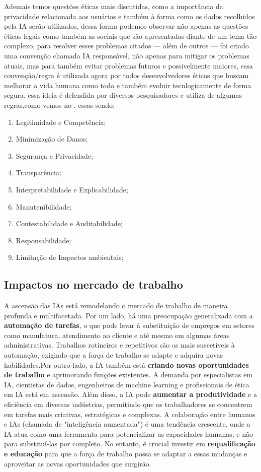 \documentclass[12pt,a4paper]{article}
\begin{document}
      Ademais temos questões éticas mais discutidas, como a importância da privacidade relacionada aos usuários e também à forma como os dados recolhidos
    pela IA serão utilizados, dessa forma podemos observar não apenas as questões éticas legais como também as sociais que são apresentadas diante de um tema tão complexo,
    para resolver esses problemas citados — além de outros — foi criado uma convenção chamada IA responsável, não apenas para mitigar os problemas atuais, 
    mas para também evitar problemas futuros e possivelmente maiores, essa convenção/regra é utilizada agora por todos desenvolvedores éticos que buscam melhorar
    a vida humana como todo e também evoluir tecnlogicamente de forma segura, essa ideia é defendida por diversos pesquisadores e utiliza de algumas regras,como vemos no \cite{Almeida_Nas_2024}. essas sendo:
    \begin{enumerate} [label=\Roman*]
      \item Legitimidade e Competência;
      \item Minimização de Danos;
      \item Segurança e Privacidade;
      \item Transparência;
      \item Interpretabilidade e Explicabilidade;
      \item Manutenibilidade;
      \item Contestabilidade e Auditabilidade;
      \item Responsabilidade;
      \item Limitação de Impactos ambientais;
    \end{enumerate}

    \subsection{Impactos no mercado de trabalho}

      A ascensão das IAs está remodelando o mercado de trabalho de maneira profunda e multifacetada. Por um lado, há uma preocupação generalizada com a 
    \textbf{automação de tarefas}, o que pode levar à substituição de empregos em setores como manufatura, atendimento ao cliente e até mesmo em algumas áreas administrativas.
    Trabalhos rotineiros e repetitivos são os mais suscetíveis à automação, exigindo que a força de trabalho se adapte e adquira novas habilidades.Por outro lado, a IA 
    também está \textbf{criando novas oportunidades de trabalho} e aprimorando funções existentes. A demanda por especialistas em IA, cientistas de dados, engenheiros 
    de machine learning e profissionais de ética em IA está em ascensão. Além disso, a IA pode \textbf{aumentar a produtividade} e a eficiência em diversas indústrias,
    permitindo que os trabalhadores se concentrem em tarefas mais criativas, estratégicas e complexas. A colaboração entre humanos e IAs (chamada de "inteligência aumentada")
    é uma tendência crescente, onde a IA atua como uma ferramenta para potencializar as capacidades humanas, e não para substituí-las por completo. No entanto, é crucial 
    investir em \textbf{requalificação e educação} para que a força de trabalho possa se adaptar a essas mudanças e aproveitar as novas oportunidades que surgirão.
\end{document}
